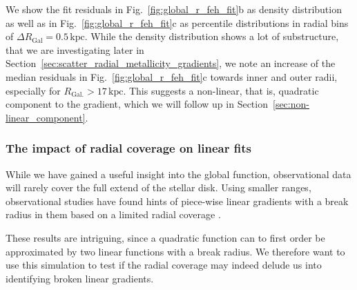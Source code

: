 \documentclass[fleqn,usenatbib]{mnras}
\begin{document}
We show the fit residuals in Fig.~\ref{fig:global_r_feh_fit}b as density distribution as well as in Fig.~\ref{fig:global_r_feh_fit}c as percentile distributions in radial bins of $\Delta R_\mathrm{Gal} = 0.5\,\mathrm{kpc}$. While the density distribution shows a lot of substructure, that we are investigating later in Section~\ref{sec:scatter_radial_metallicity_gradients}, we note an increase of the median residuals in Fig.~\ref{fig:global_r_feh_fit}c towards inner and outer radii, especially for $R_\mathrm{Gal.} > 17\,\mathrm{kpc}$. This suggests a non-linear, that is, quadratic component to the gradient, which we will follow up in Section~\ref{sec:non-linear_component}.

\subsubsection{The impact of radial coverage on linear fits}

While we have gained a useful insight into the global function, observational data will rarely cover the full extend of the stellar disk. Using smaller ranges, observational studies have found hints of piece-wise linear gradients with a break radius in them based on a limited radial coverage \citep[e.g.][]{Yong2012, Donor2020, Chen2023}.

These results are intriguing, since a quadratic function can to first order be approximated by two linear functions with a break radius. We therefore want to use this simulation to test if the radial coverage may indeed delude us into identifying broken linear gradients.
\end{document}
